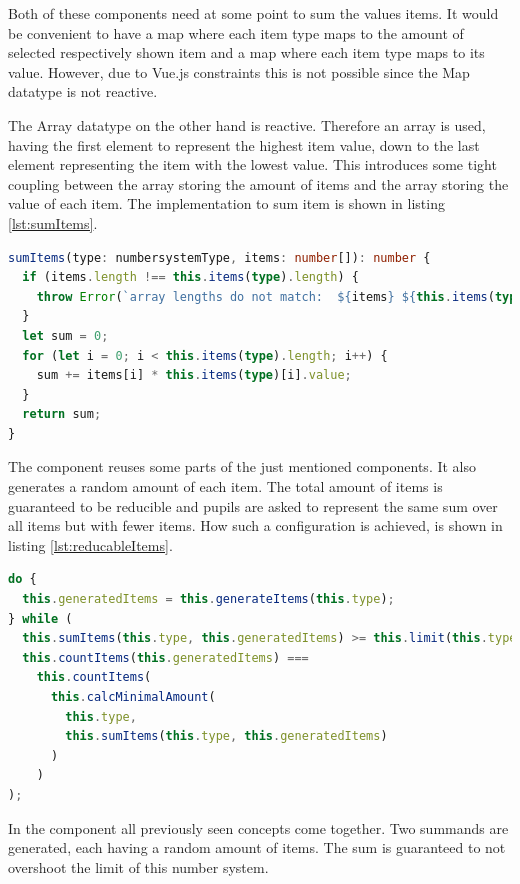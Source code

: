 Both of these components need at some point to sum the values items. It would be convenient to have a map where each item type maps to the amount of selected respectively shown item and a map where each item type maps to its value. However, due to Vue.js constraints this is not possible since the Map datatype is not reactive.

The Array datatype on the other hand is reactive. Therefore an array is used, having the first element to represent the highest item value, down to the last element representing the item with the lowest value. This introduces some tight coupling between the array storing the amount of items and the array storing the value of each item. The implementation to sum item is shown in listing \ref{lst:sumItems}.

\begin{lstlisting}[language=TypeScript,caption={Sum up items},label={lst:sumItems}]
sumItems(type: numbersystemType, items: number[]): number {
  if (items.length !== this.items(type).length) {
    throw Error(`array lengths do not match:  ${items} ${this.items(type)}`);
  }
  let sum = 0;
  for (let i = 0; i < this.items(type).length; i++) {
    sum += items[i] * this.items(type)[i].value;
  }
  return sum;
}
\end{lstlisting}

The  component reuses some parts of the just mentioned components. It also generates a random amount of each item. The total amount of items is guaranteed to be reducible and pupils are asked to represent the same sum over all items but with fewer items. How such a configuration is achieved, is shown in listing \ref{lst:reducableItems}.

\begin{lstlisting}[language=TypeScript,caption={Generate a reducible item configuration},label={lst:reducableItems}]
do {
  this.generatedItems = this.generateItems(this.type);
} while (
  this.sumItems(this.type, this.generatedItems) >= this.limit(this.type) ||
  this.countItems(this.generatedItems) ===
    this.countItems(
      this.calcMinimalAmount(
        this.type,
        this.sumItems(this.type, this.generatedItems)
      )
    )
);
\end{lstlisting}

In the  component all previously seen concepts come together. Two summands are generated, each having a random amount of items. The sum is guaranteed to not overshoot the limit of this number system. 
